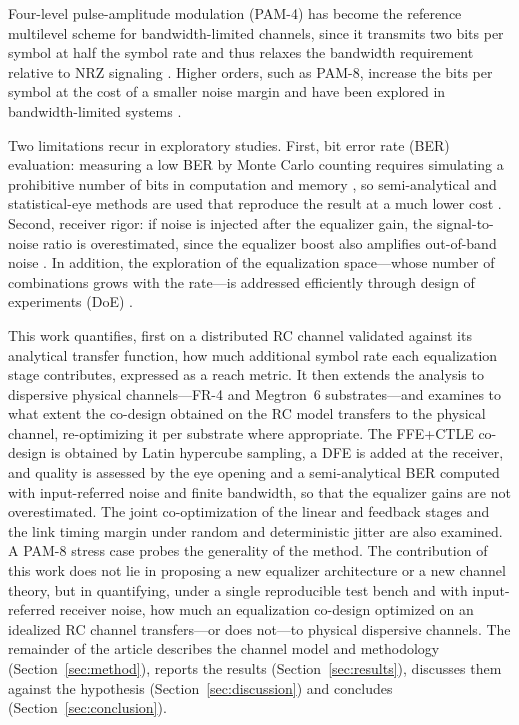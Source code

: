 \documentclass[preprint,review,12pt]{elsarticle}
\begin{document}
Four-level pulse-amplitude modulation (PAM-4) has become the reference
multilevel scheme for bandwidth-limited channels, since it transmits two
bits per symbol at half the symbol rate and thus relaxes the bandwidth
requirement relative to NRZ signaling \citep{7964959,7193371}. Higher
orders, such as PAM-8, increase the bits per symbol at the cost of a
smaller noise margin and have been explored in bandwidth-limited systems
\citep{8963973}.

Two limitations recur in exploratory studies. First, bit error rate (BER)
evaluation: measuring a low BER by Monte Carlo counting requires
simulating a prohibitive number of bits in computation and memory
\citep{6248821}, so semi-analytical and statistical-eye methods are used
that reproduce the result at a much lower cost \citep{7202856,10415105}.
Second, receiver rigor: if noise is injected after the equalizer gain, the
signal-to-noise ratio is overestimated, since the equalizer boost also
amplifies out-of-band noise \citep{9707817}. In addition, the exploration
of the equalization space---whose number of combinations grows with the
rate---is addressed efficiently through design of experiments (DoE)
\citep{7851249}.

This work quantifies, first on a distributed RC channel validated against
its analytical transfer function, how much additional symbol rate each
equalization stage contributes, expressed as a reach metric. It then
extends the analysis to dispersive physical channels---FR-4 and
Megtron~6 substrates---and examines to what extent the co-design obtained
on the RC model transfers to the physical channel, re-optimizing it per
substrate where appropriate. The FFE+CTLE co-design is obtained by Latin
hypercube sampling, a DFE is added at the receiver, and quality is
assessed by the eye opening and a semi-analytical BER computed with
input-referred noise and finite bandwidth, so that the equalizer gains are
not overestimated. The joint co-optimization of the linear and feedback
stages and the link timing margin under random and deterministic jitter
are also examined. A PAM-8 stress case probes the generality of the
method. The contribution of this work does not lie in proposing a new
equalizer architecture or a new channel theory, but in quantifying, under
a single reproducible test bench and with input-referred receiver noise,
how much an equalization co-design optimized on an idealized RC channel
transfers---or does not---to physical dispersive channels. The remainder
of the article describes the channel model and methodology
(Section~\ref{sec:method}), reports the results
(Section~\ref{sec:results}), discusses them against the hypothesis
(Section~\ref{sec:discussion}) and concludes
(Section~\ref{sec:conclusion}).
\end{document}
